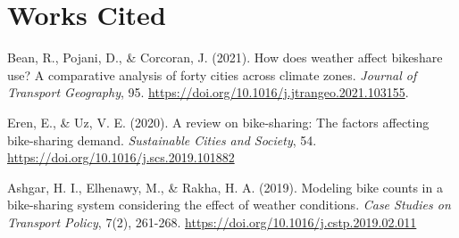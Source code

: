 \documentclass[
]{article}
\begin{document}
\hypertarget{works-cited}{%
\section{Works Cited}\label{works-cited}}

Bean, R., Pojani, D., \& Corcoran, J. (2021). How does weather affect
bikeshare use? A comparative analysis of forty cities across climate
zones. \emph{Journal of Transport Geography}, 95.
\url{https://doi.org/10.1016/j.jtrangeo.2021.103155}.

Eren, E., \& Uz, V. E. (2020). A review on bike-sharing: The factors
affecting bike-sharing demand. \emph{Sustainable Cities and Society},
54. \url{https://doi.org/10.1016/j.scs.2019.101882}

Ashgar, H. I., Elhenawy, M., \& Rakha, H. A. (2019). Modeling bike
counts in a bike-sharing system considering the effect of weather
conditions. \emph{Case Studies on Transport Policy}, 7(2), 261-268.
\url{https://doi.org/10.1016/j.cstp.2019.02.011}
\end{document}
